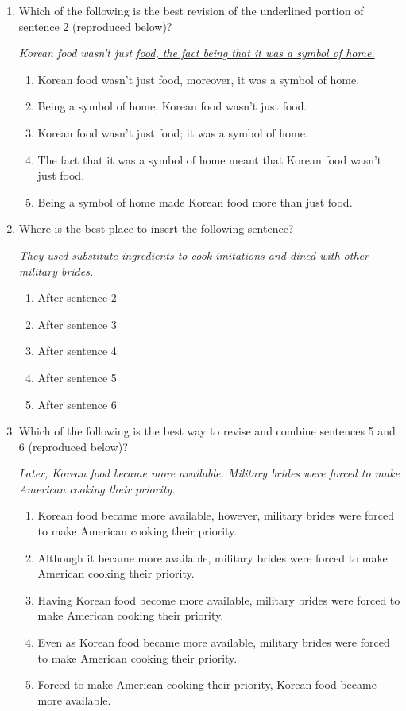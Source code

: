 \begin{enumerate}
\item{Which of the following is the best revision of the underlined portion of sentence 2 (reproduced below)?}

\textit{Korean food wasn’t just \underline{food, the fact being that it was a symbol of home.}}

\begin{enumerate}[label=(\Alph*)]
\item Korean food wasn’t just food, moreover, it was a symbol of home.
\item Being a symbol of home, Korean food wasn’t just food.
\item Korean food wasn’t just food; it was a symbol of home.
\item The fact that it was a symbol of home meant that Korean food wasn’t just food.
\item Being a symbol of home made Korean food more than just food.

\end{enumerate}

\item Where is the best place to insert the following sentence?

\textit{They used substitute ingredients to cook imitations and dined with other military brides.}

\begin{enumerate}[label=(\Alph*)]
\item After sentence 2
\item After sentence 3
\item After sentence 4
\item After sentence 5
\item After sentence 6
\end{enumerate}

\item Which of the following is the best way to revise and combine sentences 5 and 6 (reproduced below)?

\textit{Later, Korean food became more available. Military brides were forced to make American cooking their priority.}

\begin{enumerate}[label=(\Alph*)]
\item Korean food became more available, however, military brides were forced to make American cooking their priority.
\item Although it became more available, military brides were forced to make American cooking their priority.
\item Having Korean food become more available, military brides were forced to make American cooking their priority.
\item Even as Korean food became more available, military brides were forced to make American cooking their priority.
\item Forced to make American cooking their priority, Korean food became more available.
\end{enumerate}


\end{enumerate}
